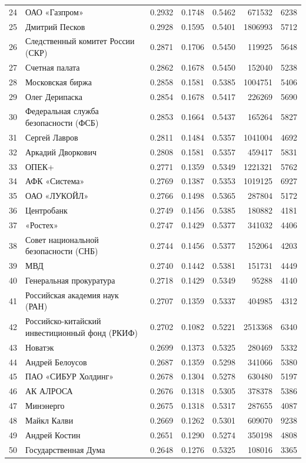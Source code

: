 {\begin{longtable}{r >{\raggedright\arraybackslash}p{4.2cm} S[table-format=1.4] S[table-format=1.4] S[table-format=1.4] r r}
24 & ОАО «Газпром» & 0.2932 & 0.1748 & 0.5462 & 671532 & 6238 \\
25 & Дмитрий Песков & 0.2928 & 0.1595 & 0.5401 & 1806993 & 5712 \\
26 & Следственный комитет России (СКР) & 0.2871 & 0.1706 & 0.5450 & 119925 & 5648 \\
27 & Счетная палата & 0.2862 & 0.1678 & 0.5450 & 152040 & 5238 \\
28 & Московская биржа & 0.2858 & 0.1581 & 0.5385 & 1004751 & 5406 \\
29 & Олег Дерипаска & 0.2854 & 0.1678 & 0.5417 & 226269 & 5690 \\
30 & Федеральная служба безопасности (ФСБ) & 0.2853 & 0.1664 & 0.5437 & 165264 & 5827 \\
31 & Сергей Лавров & 0.2811 & 0.1484 & 0.5357 & 1041004 & 4692 \\
32 & Аркадий Дворкович & 0.2808 & 0.1581 & 0.5357 & 459417 & 5831 \\
33 & ОПЕК+ & 0.2771 & 0.1359 & 0.5349 & 1221321 & 5762 \\
34 & АФК «Система» & 0.2769 & 0.1387 & 0.5353 & 1019125 & 6927 \\
35 & ОАО «ЛУКОЙЛ» & 0.2766 & 0.1498 & 0.5365 & 287804 & 5172 \\
36 & Центробанк & 0.2749 & 0.1456 & 0.5385 & 180882 & 4181 \\
37 & «Ростех» & 0.2747 & 0.1429 & 0.5377 & 341032 & 4406 \\
38 & Совет национальной безопасности (СНБ) & 0.2744 & 0.1456 & 0.5377 & 152064 & 4203 \\
39 & МВД & 0.2740 & 0.1442 & 0.5381 & 151731 & 4449 \\
40 & Генеральная прокуратура & 0.2718 & 0.1429 & 0.5349 & 95288 & 4140 \\
41 & Российская академия наук (РАН) & 0.2707 & 0.1359 & 0.5337 & 404985 & 4312 \\
42 & Российско-китайский инвестиционный фонд (РКИФ) & 0.2702 & 0.1082 & 0.5221 & 2513368 & 6340 \\
43 & Новатэк & 0.2699 & 0.1373 & 0.5325 & 280469 & 5332 \\
44 & Андрей Белоусов & 0.2687 & 0.1359 & 0.5298 & 341066 & 5380 \\
45 & ПАО «СИБУР Холдинг» & 0.2678 & 0.1304 & 0.5278 & 630480 & 5197 \\
46 & АК АЛРОСА & 0.2676 & 0.1318 & 0.5305 & 378378 & 5386 \\
47 & Минэнерго & 0.2675 & 0.1318 & 0.5317 & 287655 & 4087 \\
48 & Майкл Калви & 0.2669 & 0.1262 & 0.5301 & 609070 & 9238 \\
49 & Андрей Костин & 0.2651 & 0.1290 & 0.5274 & 350198 & 4808 \\
50 & Государственная Дума & 0.2648 & 0.1276 & 0.5325 & 108016 & 3365 \\
\end{longtable}
}

